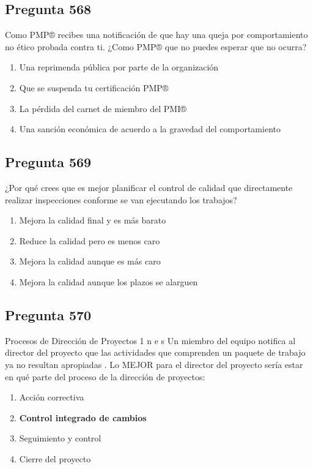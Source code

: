 \documentclass[11pt,a4paper]{article}
\begin{document}
\subsection*{Pregunta 568}
Como PMP® recibes una notificación de que hay una queja por comportamiento no ético probada contra ti. ¿Como PMP® que no puedes esperar que no ocurra?

\begin{enumerate}[label=\alph*)]
  \item Una reprimenda pública por parte de la organización
  \item Que se suspenda tu certificación PMP®
  \item La pérdida del carnet de miembro del PMI®
  \item Una sanción económica de acuerdo a la gravedad del comportamiento
\end{enumerate}

\subsection*{Pregunta 569}
¿Por qué crees que es mejor planificar el control de calidad que directamente realizar inspecciones conforme se van ejecutando los trabajos?

\begin{enumerate}[label=\alph*)]
  \item Mejora la calidad final y es más barato
  \item Reduce la calidad pero es menos caro
  \item Mejora la calidad aunque es más caro
  \item Mejora la calidad aunque los plazos se alarguen
\end{enumerate}

\subsection*{Pregunta 570}
Procesos de Dirección de Proyectos 1 n e s Un miembro del equipo notifica al director del proyecto que las actividades que comprenden un paquete de trabajo ya no resultan apropiadas . Lo MEJOR para el director del proyecto sería estar en qué parte del proceso de la dirección de proyectos:

\begin{enumerate}[label=\alph*)]
  \item Acción correctiva
  \item \textbf{Control integrado de cambios}
  \item Seguimiento y control
  \item Cierre del proyecto
\end{enumerate}
\end{document}
